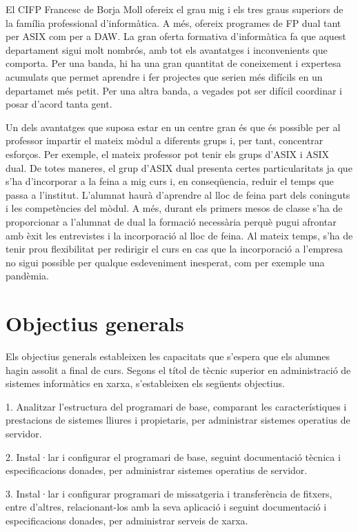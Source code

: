 \documentclass[catalan, a4paper, 12pt, titlepage]{article}
\begin{document}
El CIFP Francesc de Borja Moll ofereix el grau mig i els tres graus superiors de la família professional d'informàtica. 
A més, ofereix programes de FP dual tant per ASIX com per a DAW.
La gran oferta formativa d'informàtica fa que aquest departament sigui molt nombrós, amb tot els avantatges i inconvenients que comporta.
Per una banda, hi ha una gran quantitat de coneixement i expertesa acumulats que permet aprendre i fer projectes que serien més difícils en un departamet més petit.
Per una altra banda, a vegades pot ser difícil coordinar i posar d'acord tanta gent.

Un dels avantatges que suposa estar en un centre gran és que és possible per al professor impartir el mateix mòdul a diferents grups i, per tant, concentrar esforços.
Per exemple, el mateix professor pot tenir els grups d'ASIX i ASIX dual.
De totes maneres, el grup d'ASIX dual presenta certes particularitats ja que s'ha d'incorporar a la feina a mig curs i, en conseqüencia, reduir el temps que passa a l'institut.
L'alumnat haurà d'aprendre al lloc de feina part dels coninguts i les competències del mòdul.
A més, durant els primers mesos de classe s'ha de proporcionar a l'alumnat de dual la formació necessària perquè pugui afrontar amb èxit les entrevistes i la incorporació al lloc de feina.
Al mateix temps, s'ha de tenir prou flexibilitat per redirigir el curs en cas que la incorporació a l'empresa no sigui possible per qualque esdeveniment inesperat, com per exemple una pandèmia.

\section{Objectius generals}

Els objectius generals estableixen les capacitats que s'espera que els alumnes hagin assolit a final de curs. Segons el títol de tècnic superior en administració de sistemes informàtics en xarxa, s'estableixen els següents objectius.

1. Analitzar l'estructura del programari de base, comparant les característiques i prestacions de sistemes lliures i propietaris, per administrar sistemes operatius de servidor.

2. Instal·lar i configurar el programari de base, seguint documentació tècnica i especificacions donades, per administrar sistemes operatius de servidor.

3. Instal·lar i configurar programari de missatgeria i transferència de fitxers, entre d'altres, relacionant-los amb la seva aplicació i seguint documentació i especificacions donades, per administrar serveis de xarxa.
\end{document}
